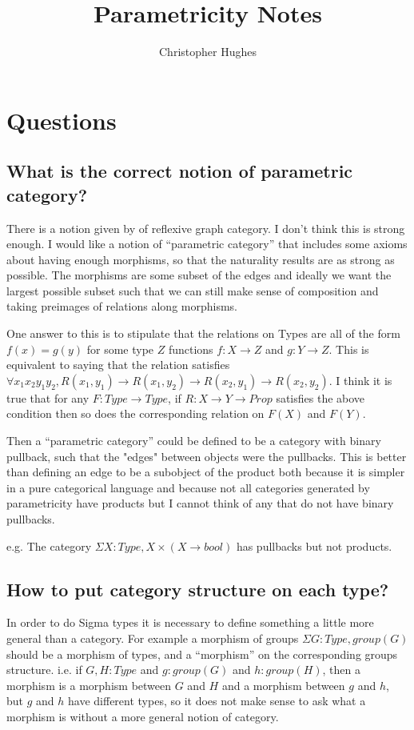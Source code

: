 \documentclass[12pt]{article} %
\title{Parametricity Notes}
\author{Christopher Hughes}
\theoremstyle{definition}
\theoremstyle{definition}
\theoremstyle{definition}
\theoremstyle{definition}
\begin{document}
\section{Questions}

\subsection{What is the correct notion of parametric category?}

There is a notion given by \cite{Hermida2014LogicalRA} of reflexive graph category. 
I don't think this is strong enough. I would like a notion of ``parametric category'' that
includes some axioms about having enough morphisms, so that the naturality results are as strong as
possible. The morphisms are some subset of the edges and ideally we want the largest 
possible subset such that we can still make sense of composition and taking preimages of relations
along morphisms.

One answer to this is to stipulate that the relations on Types are all of the form $f(x) = g(y)$ for 
some type $Z$ functions $f : X \rightarrow Z$ and $g : Y \rightarrow Z$. This is equivalent to saying
that the relation satisfies $\forall x_1 x_2 y_1 y_2, R(x_1, y_1) \rightarrow R(x_1, y_2) 
\rightarrow R(x_2, y_1) \rightarrow R(x_2, y_2)$.
I think it is true that for any $F : Type \rightarrow Type$, if $R : X \rightarrow Y \rightarrow Prop$
satisfies the above condition then so does the corresponding relation on $F(X)$ and $F(Y)$.

Then a ``parametric category'' could be defined to be a category with binary pullback, such that 
the "edges" between objects were the pullbacks. This is better than defining an edge to be a subobject 
of the product both because it is simpler in a pure categorical language and because not all categories
generated by parametricity have products but I cannot think of any that do not have binary pullbacks.

e.g. The category $\Sigma X : Type, X \times (X \to bool)$ has pullbacks but not products. 


\subsection{How to put category structure on each type?}

In order to do Sigma types it is necessary to define something a little more general than a category.
For example a morphism of groups $\Sigma G : Type, group(G)$ should be a morphism of types, and a ``morphism''
on the corresponding groups structure. i.e. if $G, H : Type$ and $g : group(G)$ and $h : group(H)$,
then a morphism is a morphism between $G$ and $H$ and a morphism between $g$ and $h$, but $g$ and $h$ have 
different types, so it does not make sense to ask what a morphism is without a more general notion of category.
\end{document}
